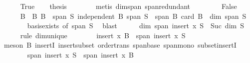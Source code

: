 \begin{isabellebody}
\ \ \ \ \isamarkupfalse%
\ True\ \isamarkupfalse%
\ \isamarkupfalse%
\ {\isacharquery}{\kern0pt}thesis\isanewline
\ \ \ \ \ \ \isamarkupfalse%
\ {\isacharparenleft}{\kern0pt}metis\ dim{\isacharunderscore}{\kern0pt}span\ span{\isacharunderscore}{\kern0pt}redundant{\isacharparenright}{\kern0pt}\isanewline
\ \ \isamarkupfalse%
\isanewline
\ \ \ \ \isamarkupfalse%
\ False\isanewline
\ \ \ \ \isamarkupfalse%
\ B\ \ B{\isacharcolon}{\kern0pt}\ {\isachardoublequoteopen}B\ {\isasymsubseteq}\ span\ S{\isachardoublequoteclose}\ {\isachardoublequoteopen}independent\ B{\isachardoublequoteclose}\ {\isachardoublequoteopen}span\ S\ {\isasymsubseteq}\ span\ B{\isachardoublequoteclose}\ {\isachardoublequoteopen}card\ B\ {\isacharequal}{\kern0pt}\ dim\ {\isacharparenleft}{\kern0pt}span\ S{\isacharparenright}{\kern0pt}{\isachardoublequoteclose}\isanewline
\ \ \ \ \ \ \isamarkupfalse%
\ basis{\isacharunderscore}{\kern0pt}exists\ {\isacharbrackleft}{\kern0pt}of\ {\isachardoublequoteopen}span\ S{\isachardoublequoteclose}{\isacharbrackright}{\kern0pt}\ \isamarkupfalse%
\ blast\isanewline
\ \ \ \ \isamarkupfalse%
\ {\isachardoublequoteopen}dim\ {\isacharparenleft}{\kern0pt}span\ {\isacharparenleft}{\kern0pt}insert\ x\ S{\isacharparenright}{\kern0pt}{\isacharparenright}{\kern0pt}\ {\isacharequal}{\kern0pt}\ Suc\ {\isacharparenleft}{\kern0pt}dim\ S{\isacharparenright}{\kern0pt}{\isachardoublequoteclose}\isanewline
\ \ \ \ \isamarkupfalse%
\ {\isacharparenleft}{\kern0pt}rule\ dim{\isacharunderscore}{\kern0pt}unique{\isacharparenright}{\kern0pt}\isanewline
\ \ \ \ \ \ \isamarkupfalse%
\ {\isachardoublequoteopen}insert\ x\ B\ {\isasymsubseteq}\ span\ {\isacharparenleft}{\kern0pt}insert\ x\ S{\isacharparenright}{\kern0pt}{\isachardoublequoteclose}\isanewline
\ \ \ \ \ \ \ \ \isamarkupfalse%
\ {\isacharparenleft}{\kern0pt}meson\ B{\isacharparenleft}{\kern0pt}{}{\isacharparenright}{\kern0pt}\ insertI{}\ insert{\isacharunderscore}{\kern0pt}subset\ order{\isacharunderscore}{\kern0pt}trans\ span{\isacharunderscore}{\kern0pt}base\ span{\isacharunderscore}{\kern0pt}mono\ subset{\isacharunderscore}{\kern0pt}insertI{\isacharparenright}{\kern0pt}\isanewline
\ \ \ \ \ \ \isamarkupfalse%
\ {\isachardoublequoteopen}span\ {\isacharparenleft}{\kern0pt}insert\ x\ S{\isacharparenright}{\kern0pt}\ {\isasymsubseteq}\ span\ {\isacharparenleft}{\kern0pt}insert\ x\ B{\isacharparenright}{\kern0pt}{\isachardoublequoteclose}\isanewline

\end{isabellebody}
